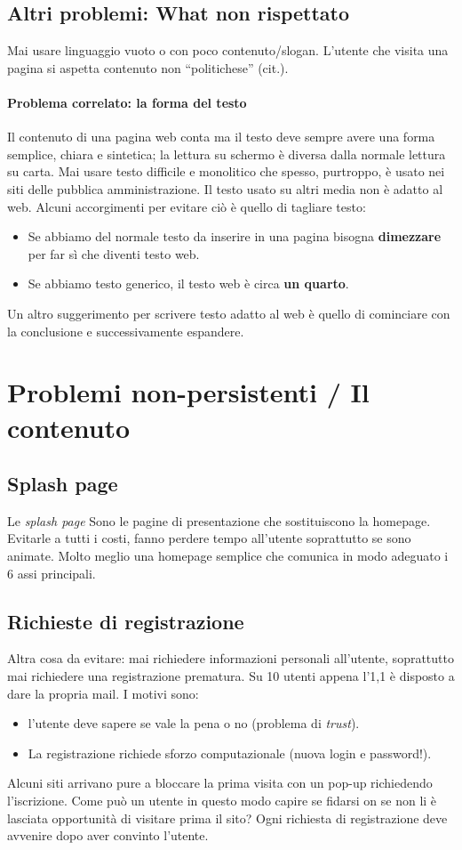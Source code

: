 		\subsection{Altri problemi: What non rispettato}
			Mai usare linguaggio vuoto o con poco contenuto/slogan. L'utente che visita una pagina si aspetta contenuto non ``politichese'' (cit.).
			
			\paragraph{Problema correlato: la forma del testo}
				Il contenuto di una pagina web conta ma il testo deve sempre avere una forma semplice, chiara e sintetica; la lettura su schermo è diversa dalla normale lettura su carta. Mai usare testo difficile e monolitico che spesso, purtroppo, è usato nei siti delle pubblica amministrazione. Il testo usato su altri media non è adatto al web. Alcuni accorgimenti per evitare ciò è quello di tagliare testo:
				\begin{itemize}
					\item Se abbiamo del normale testo da inserire in una pagina bisogna \textbf{dimezzare} per far sì che diventi testo web.
					\item Se abbiamo testo generico, il testo web è circa \textbf{un quarto}.
				\end{itemize}
				Un altro suggerimento per scrivere testo adatto al web è quello di cominciare con la conclusione e successivamente espandere.
	
	\section{Problemi non-persistenti / Il contenuto}
	
		\subsection{Splash page}
			Le \emph{splash page} Sono le pagine di presentazione che sostituiscono la homepage. Evitarle a tutti i costi, fanno perdere tempo all'utente soprattutto se sono  animate. Molto meglio una homepage semplice che comunica in modo adeguato i 6 assi principali.
		\subsection{Richieste di registrazione}
			Altra cosa da evitare: mai richiedere informazioni personali all'utente, soprattutto mai richiedere una registrazione prematura. Su 10 utenti appena l'1,1 è disposto a dare la propria mail. I motivi sono:
			\begin{itemize}
				\item l'utente deve sapere se vale la pena o no (problema di \emph{trust}).
				\item La registrazione richiede sforzo computazionale (nuova login e password!).
			\end{itemize}
			Alcuni siti arrivano pure a bloccare la prima visita con un pop-up richiedendo l'iscrizione. Come può un utente in questo modo capire se fidarsi on se non li è lasciata opportunità di visitare prima il sito? Ogni richiesta di registrazione deve avvenire dopo aver convinto l'utente.
			
